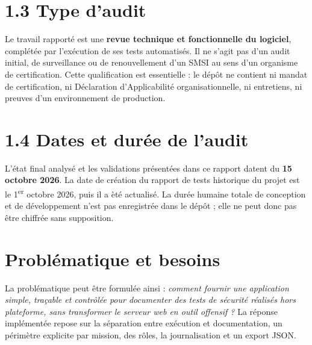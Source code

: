 \section*{1.3 Type d'audit}
Le travail rapport\'e est une \textbf{revue technique et fonctionnelle du logiciel}, compl\'et\'ee par l'ex\'ecution de ses tests automatis\'es. Il ne s'agit pas d'un audit initial, de surveillance ou de renouvellement d'un SMSI au sens d'un organisme de certification. Cette qualification est essentielle : le d\'ep\^ot ne contient ni mandat de certification, ni D\'eclaration d'Applicabilit\'e organisationnelle, ni entretiens, ni preuves d'un environnement de production.

\section*{1.4 Dates et dur\'ee de l'audit}
L'\'etat final analys\'e et les validations pr\'esent\'ees dans ce rapport datent du \textbf{15 octobre 2026}. La date de cr\'eation du rapport de tests historique du projet est le 1\textsuperscript{er} octobre 2026, puis il a \`et\'e actualis\'e. La dur\'ee humaine totale de conception et de d\'eveloppement n'est pas enregistr\'ee dans le d\'ep\^ot ; elle ne peut donc pas \^etre chiffr\'ee sans supposition.

\section*{Probl\'ematique et besoins}
La probl\'ematique peut \^etre formul\'ee ainsi : \emph{comment fournir une application simple, tra\c{c}able et contr\^ol\'ee pour documenter des tests de s\'ecurit\'e r\'ealis\'es hors plateforme, sans transformer le serveur web en outil offensif ?} La r\'eponse impl\'ement\'ee repose sur la s\'eparation entre ex\'ecution et documentation, un p\'erim\`etre explicite par mission, des r\^oles, la journalisation et un export JSON.
